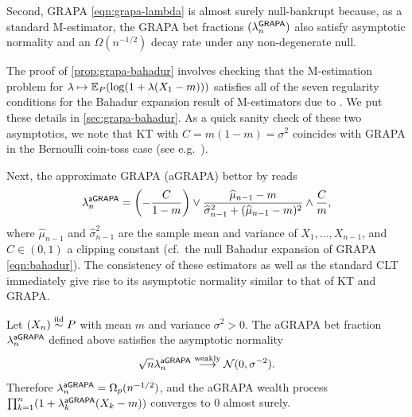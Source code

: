 Second, GRAPA \eqref{eqn:grapa-lambda} is almost surely null-bankrupt because, as a standard M-estimator, the GRAPA bet fractions $(\lambda^{\mathsf{GRAPA}}_n)$ also satisfy asymptotic normality and an $\Omega(n^{-1/2})$ decay rate under any non-degenerate null.
The proof of \cref{prop:grapa-bahadur} involves checking that the M-estimation problem for $\lambda \mapsto \mathbb E_P(\log(1+\lambda(X_1 - m)))$ satisfies all of the seven regularity conditions for the Bahadur expansion result of M-estimators due to \cite{niemiro1992asymptotics}. We put these details in \cref{sec:grapa-bahadur}. As a quick sanity check of these two asymptotics, we note that KT with $C = m(1-m) = \sigma^2$ coincides with GRAPA in the Bernoulli coin-toss case (see e.g.\ \citet[Section 4]{orabona2016coin}).

Next, the approximate GRAPA (aGRAPA) bettor by \citet[Section B.3]{waudby2024estimating} reads
\begin{equation}
   \lambda^{\mathsf{aGRAPA}}_n = \left( -\frac{C}{1-m} \right) \vee \frac{\widehat \mu_{n-1} - m}{\widehat\sigma^2_{n-1}+(\widehat \mu_{n-1} - m)^2} \wedge \frac{C}{m} ,
\end{equation}
where $\widehat \mu_{n-1}$ and $\widehat\sigma^2_{n-1}$ are the sample mean and variance of $X_1,\dots, X_{n-1}$, and $C\in(0,1)$ a clipping constant (cf.\ the null Bahadur expansion of GRAPA \eqref{eqn:bahadur}). The consistency of these estimators as well as the standard CLT immediately give rise to its asymptotic normality similar to that of KT and GRAPA.
\begin{proposition} Let $(X_n)\overset{\mathrm{iid}}{\sim} P$ with mean $m$ and variance $\sigma^2 > 0$.
    The aGRAPA bet fraction $\lambda^{\mathsf{aGRAPA}}_n$ defined above satisfies the asymptotic normality
    \begin{equation}
         \sqrt{n}\lambda^{\mathsf{aGRAPA}}_{n}  \stackrel{\text{weakly}}{\longrightarrow} \mathcal{N}(0,\sigma^{-2}).
    \end{equation}
    Therefore $\lambda^{\mathsf{aGRAPA}}_n = \Omega_p(n^{-1/2})$, and the aGRAPA wealth process $\prod_{k=1}^n(1+\lambda^{\mathsf{aGRAPA}}_k(X_k - m))$ converges to 0 almost surely.
\end{proposition}

